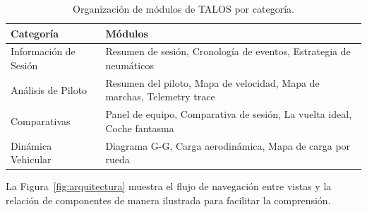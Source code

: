 \documentclass[12pt,a4paper,twoside,openright]{book}
\begin{document}
\begin{table}[H]
  \centering
  \caption{Organización de módulos de TALOS por categoría.}
  \label{tab:modulos}
  \small
  \begin{tabularx}{\textwidth}{l X}
    \toprule
    \textbf{Categoría} & \textbf{Módulos} \\
    \midrule
    Información de Sesión  & Resumen de sesión, Cronología de eventos, Estrategia de neumáticos \\
    Análisis de Piloto     & Resumen del piloto, Mapa de velocidad, Mapa de marchas, Telemetry trace \\
    Comparativas           & Panel de equipo, Comparativa de sesión, La vuelta ideal, Coche fantasma \\
    Dinámica Vehicular     & Diagrama G-G, Carga aerodinámica, Mapa de carga por rueda \\
    \bottomrule
  \end{tabularx}
\end{table}

\noindent La Figura~\ref{fig:arquitectura} muestra el flujo de navegación entre vistas y la relación de componentes de manera ilustrada para facilitar la comprensión.
\end{document}
